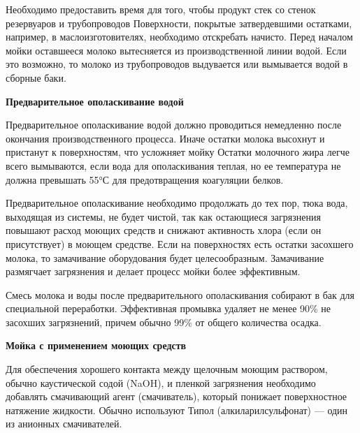 \documentclass[a4paper,12pt,oneside]{extarticle}
\begin{document}
	\begin{flushleft}
		Необходимо предоставить время для того, чтобы продукт стек со стенок резервуаров и трубопроводов Поверхности, покрытые затвердевшими остатками, например, в маслоизготовителях, необходимо отскребать начисто. Перед началом мойки оставшееся молоко вытесняется из производственной линии водой. Если это возможно, то молоко из трубопроводов выдувается или вымывается водой в сборные баки.
	\end{flushleft}
	
	\begin{flushleft}
		\bfseries Предварительное ополаскивание водой
	\end{flushleft}	
	
	\begin{flushleft}
		Предварительное ополаскивание водой должно проводиться немедленно после окончания производственного процесса. Иначе остатки молока высохнут и пристанут к поверхностям, что усложняет мойку Остатки молочного жира легче всего вымываются, если вода для ополаскивания теплая, но ее температура не должна превышать 55°С для предотвращения коагуляции белков.
	\end{flushleft}
	
	\begin{flushleft}
		Предварительное ополаскивание необходимо продолжать до тех пор, тюка вода, выходящая из системы, не будет чистой, так как остающиеся загрязнения повышают расход моющих средств и снижают активность хлора (если он присутствует) в моющем средстве. Если на поверхностях есть остатки засохшего молока, то замачивание оборудования будет целесообразным. Замачивание размягчает загрязнения и делает процесс мойки более эффективным.
	\end{flushleft}
	
	\begin{flushleft}
		Смесь молока и воды после предварительного ополаскивания собирают в бак для специальной переработки. Эффективная промывка удаляет не менее 90\% не засохших загрязнений, причем обычно 99\% от общего количества осадка.
	\end{flushleft}
	
	\begin{flushleft}
		\bfseries Мойка с применением моющих средств
	\end{flushleft}
	
	\begin{flushleft}
	Для обеспечения хорошего контакта между щелочным моющим раствором, обычно каустической содой (NaOH), и пленкой загрязнения необходимо добавлять смачивающий агент (смачиватель), который понижает поверхностное натяжение жидкости. Обычно используют Типол (алкиларилсульфонат) — один из анионных смачивателей.
	\end{flushleft}
	
\end{document}
